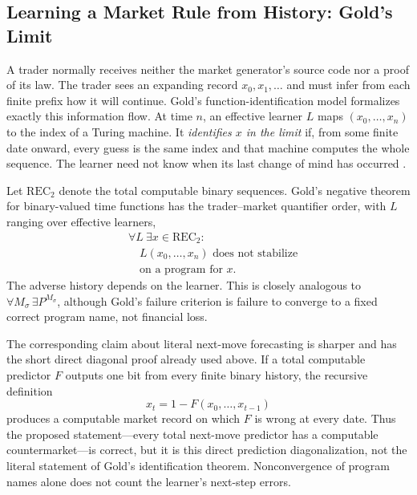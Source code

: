 \documentclass[aps,pra,reprint,superscriptaddress,amsmath,amssymb,floatfix]{revtex4-2}
\theoremstyle{plain}
\theoremstyle{definition}
\theoremstyle{remark}
\begin{document}
\subsection{Learning a Market Rule from History: Gold's Limit}

A trader normally receives neither the market generator's source code nor a
proof of its law. The trader sees an expanding record
\(x_0,x_1,\ldots\) and must infer from each finite prefix how it will continue.
Gold's function-identification model formalizes exactly this information flow.
At time \(n\), an effective learner \(L\) maps
\((x_0,\ldots,x_n)\) to the index of a Turing machine. It
\emph{identifies \(x\) in the limit} if, from some finite date onward, every
guess is the same index and that machine computes the whole sequence. The
learner need not know when its last change of mind has occurred
\cite{go-65,go-67}.

Let \(\mathrm{REC}_2\) denote the total computable binary sequences. Gold's
negative theorem for binary-valued time functions has the trader--market
quantifier order, with \(L\) ranging over effective learners,
\begin{equation}
  \begin{aligned}
  &\forall L\ \exists x\in\mathrm{REC}_2: \\
  &\quad L(x_0,\ldots,x_n)\text{ does not stabilize}\\
  &\quad \text{on a program for }x .
  \end{aligned}
  \label{eq:goldquantifiers}
\end{equation}
The adverse history depends on the learner. This is closely analogous to
\(\forall M_\sigma\,\exists P^{M_\sigma}\), although Gold's failure criterion
is failure to converge to a fixed correct program name, not financial loss.

The corresponding claim about literal next-move forecasting is sharper and
has the short direct diagonal proof already used above. If a total computable
predictor \(F\) outputs one bit from every finite binary history, the recursive
definition
\[
  x_t=1-F(x_0,\ldots,x_{t-1})
\]
produces a computable market record on which \(F\) is wrong at every date.
Thus the proposed statement---every total next-move predictor has a computable
countermarket---is correct, but it is this direct prediction diagonalization,
not the literal statement of Gold's identification theorem. Nonconvergence of
program names alone does not count the learner's next-step errors.
\end{document}
